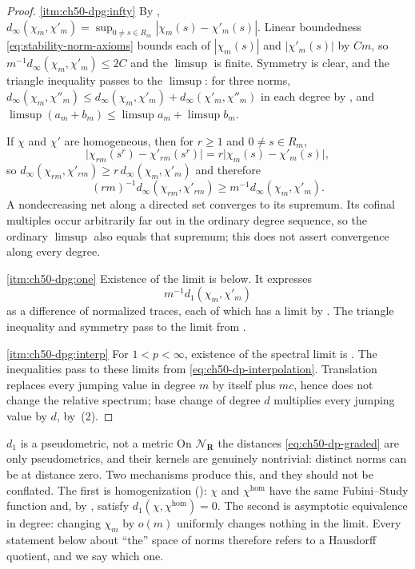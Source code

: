\begin{proof}
\cref{itm:ch50-dpg:infty}  By ,
$d_\infty(\chi_m,\chi'_m)=\sup_{0\ne s\in R_m}|\chi_m(s)-\chi'_m(s)|$.
Linear boundedness \eqref{eq:stability-norm-axioms} bounds each of
$|\chi_m(s)|$ and $|\chi'_m(s)|$ by $Cm$, so
$m^{-1}d_\infty(\chi_m,\chi'_m)\le2C$ and the $\limsup$ is finite.
Symmetry is clear, and the triangle inequality passes to the $\limsup$:
for three norms, $d_\infty(\chi_m,\chi''_m)\le
d_\infty(\chi_m,\chi'_m)+d_\infty(\chi'_m,\chi''_m)$ in each degree by
, and $\limsup(a_m+b_m)\le\limsup a_m
+\limsup b_m$.

If $\chi$ and $\chi'$ are homogeneous, then for $r\ge1$ and
$0\ne s\in R_m$,
\[
 \bigl|\chi_{rm}(s^r)-\chi'_{rm}(s^r)\bigr|
 =r\bigl|\chi_m(s)-\chi'_m(s)\bigr| ,
\]
so $d_\infty(\chi_{rm},\chi'_{rm})\ge r\,d_\infty(\chi_m,\chi'_m)$ and
therefore
\[
 (rm)^{-1}d_\infty(\chi_{rm},\chi'_{rm})
 \ge m^{-1}d_\infty(\chi_m,\chi'_m).
\]
A nondecreasing net along a directed set
converges to its supremum.  Its cofinal multiples occur arbitrarily far
out in the ordinary degree sequence, so the ordinary $\limsup$ also
equals that supremum; this does not assert convergence along every degree.

\cref{itm:ch50-dpg:one}  Existence of the limit is
 below.  It expresses
\[
 m^{-1}d_1(\chi_m,\chi'_m)
\]
as a difference of normalized traces, each of which has a limit by
.  The triangle
inequality and symmetry pass to the limit from
.

\cref{itm:ch50-dpg:interp}  For $1<p<\infty$, existence of the spectral
limit is \cite[Theorem~3.3]{BJKS1}.  The inequalities pass to these limits
from \eqref{eq:ch50-dp-interpolation}.  Translation replaces every jumping value
in degree $m$ by itself plus $mc$, hence does not change the relative
spectrum; base change of degree $d$ multiplies every jumping value by
$d$, by \,(2).
\end{proof}

\begin{warning}{$d_1$ is a pseudometric, not a metric}
\label{warn:ch50-pseudometric}
On $\mathcal N_{\mathbf R}$ the distances \eqref{eq:ch50-dp-graded} are
only pseudometrics, and their kernels are genuinely nontrivial: distinct
norms can be at distance zero.  Two mechanisms produce this, and they
should not be conflated.  The first is homogenization
(): $\chi$ and $\chi^{\hom}$ have the
same Fubini--Study function and, by
, satisfy
$d_1(\chi,\chi^{\hom})=0$.  The second is asymptotic equivalence in
degree: changing $\chi_m$ by $o(m)$ uniformly changes nothing in the
limit.  Every statement below about ``the'' space of norms therefore refers
to a Hausdorff quotient, and we say which one.
\end{warning}


